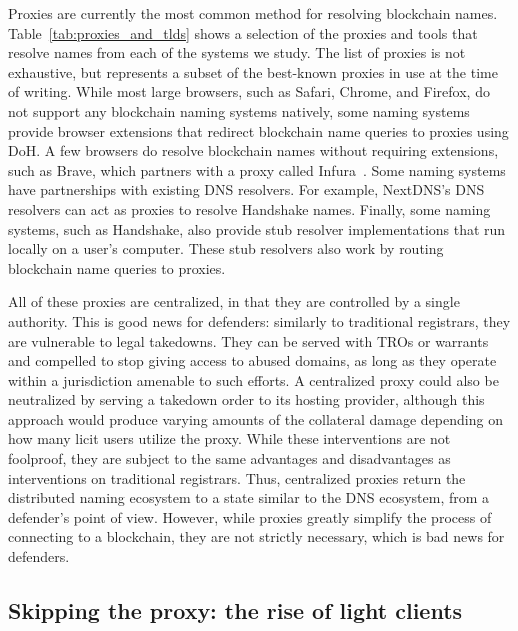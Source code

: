 Proxies are currently the most common method for resolving 
blockchain names. Table~\ref{tab:proxies_and_tlds} shows a 
selection of the proxies and tools that resolve names from 
each of the systems we study. The list of proxies is not 
exhaustive, but represents 
a subset of the best-known proxies in use at the time of 
writing. While most large 
browsers, such as Safari, Chrome, and Firefox, do not support 
any blockchain naming systems natively, some naming systems 
provide browser extensions that redirect blockchain name 
queries to proxies using DoH. A few browsers do resolve 
blockchain names without requiring extensions, such as Brave, 
which partners with a proxy called 
Infura~\cite{brave_uses_infura}. Some naming systems have 
partnerships with existing DNS resolvers. For example, 
NextDNS's DNS resolvers can act as proxies to resolve 
Handshake names. Finally, some naming systems, such as 
Handshake, also provide stub resolver implementations that 
run locally on a user's computer. These stub resolvers also 
work by routing blockchain name queries to proxies.

All of these proxies are centralized, in that they 
are controlled by a single authority. This is good 
news for defenders: similarly to traditional registrars, they 
are vulnerable to legal takedowns. They can be served with 
TROs or warrants and compelled to stop giving access to 
abused domains, as long as they operate within a jurisdiction 
amenable to such efforts. A centralized proxy could also be 
neutralized by serving a takedown order to its 
hosting provider, although this approach would produce 
varying amounts of the collateral damage depending on how 
many licit users utilize the proxy. 
While these interventions are not 
foolproof, they are subject to the same advantages and 
disadvantages as interventions on traditional registrars. 
Thus, centralized proxies return the distributed naming 
ecosystem to a state similar to the DNS ecosystem, from a 
defender's point of view. 
However, while proxies greatly simplify the process of 
connecting to a blockchain, they are not strictly necessary, 
which is bad news for defenders.

\subsection{Skipping the proxy: the rise of light clients}

